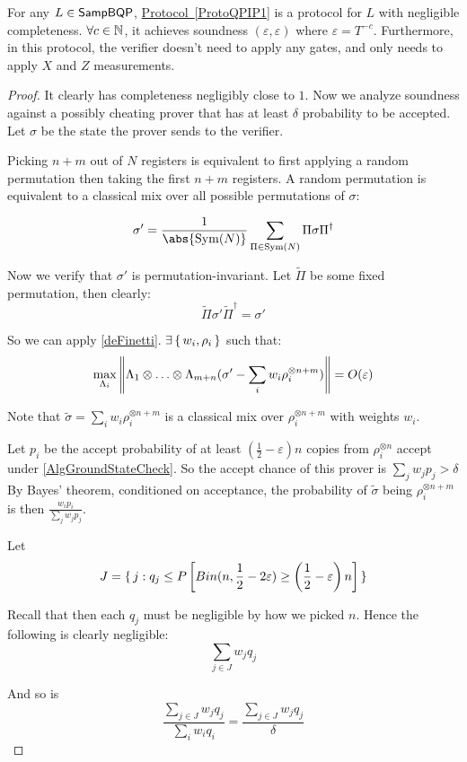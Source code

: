 \begin{theorem}
    \label{QPIP1thm}
	For any $L\in\operatorname{\mathsf{SampBQP}}$, \hyperref[ProtoQPIP1]{Protocol~\ref*{ProtoQPIP1}} is a protocol for $L$ with negligible completeness. $\forall c\in\mathbb{N}$, it achieves soundness $(\varepsilon, \varepsilon)$ where $\varepsilon=T^{-c}$. Furthermore, in this protocol, the verifier doesn't need to apply any gates, and only needs to apply $X$ and $Z$ measurements.
\end{theorem}
\begin{proof}
	It clearly has completeness negligibly close to $1$. Now we analyze soundness against a possibly cheating prover that has at least $\delta$ probability to be accepted. Let $\sigma$ be the state the prover sends to the verifier.

	Picking $n+m$ out of $N$ registers is equivalent to first applying a random permutation then taking the first $n+m$ registers.
	A random permutation is equivalent to a classical mix over all possible permutations of $\sigma$:

	$$\sigma'=\frac{1}{\abs{\Sym(N)}}\sum_{\Pi\in\Sym(N)}\Pi\sigma\Pi^\dagger$$

	Now we verify that $\sigma'$ is permutation-invariant.
	Let $\tilde{\Pi}$ be some fixed permutation, then clearly:
	$$\tilde{\Pi}\sigma'\tilde{\Pi}^\dagger=\sigma'$$

	So we can apply \autoref{deFinetti}. $\exists\set{w_i, \rho_i}$ such that:
	$$\max_{\Lambda_i}\left\lVert\Lambda_1\otimes\ldots\otimes\Lambda_{m+n}(\sigma'-\sum_i w_i\rho_i^{\otimes n+m})\right\rVert=O(\varepsilon)$$

	Note that $\tilde\sigma=\sum_i w_i\rho_i^{\otimes n+m}$ is a classical mix over $\rho_i^{\otimes n+m}$ with weights $w_i$.

	Let $p_i$ be the accept probability of at least $(\frac{1}{2}-\varepsilon)n$ copies from $\rho_i^{\otimes n}$ accept under \autoref{AlgGroundStateCheck}.
	So the accept chance of this prover is $\sum_j w_j p_j>\delta$
	By Bayes' theorem, conditioned on acceptance, the probability of $\tilde{\sigma}$ being $\rho_i^{\otimes n+m}$ is then $\frac{w_i p_i}{\sum_j w_j p_j}$.

	Let
	$$J=\set{j:q_j\leq P\left[Bin(n, \frac{1}{2}-2\varepsilon)\geq\left(\frac{1}{2}-\varepsilon\right)n\right]}$$

	Recall that then each $q_j$ must be negligible by how we picked $n$. Hence the following is clearly negligible:
	$$\sum_{j\in J} w_j q_j$$

	And so is
	$$\frac{\sum_{j\in J} w_j q_j}{\sum_i w_i q_i}=\frac{\sum_{j\in J} w_j q_j}{\delta}$$


\end{proof}
